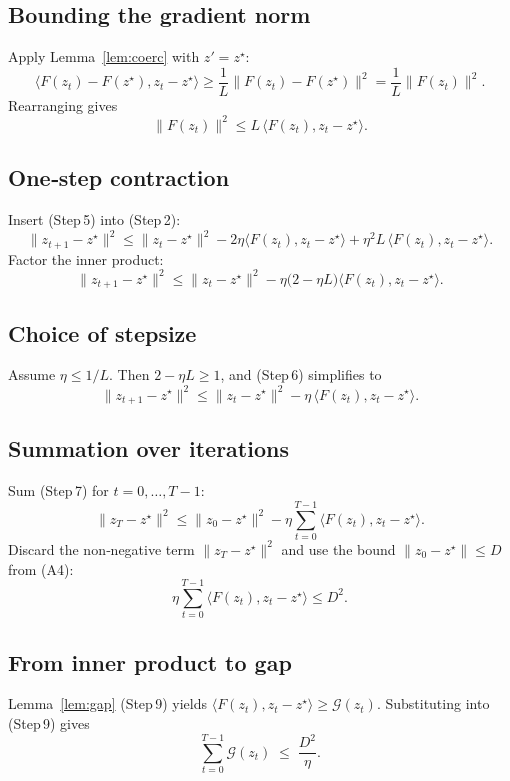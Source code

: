 \documentclass{article}
\begin{document}
\subsection*{Bounding the gradient norm}
Apply Lemma~\ref{lem:coerc} with $z'=z^{\star}$:
\[
\langle F(z_t)-F(z^{\star}),z_t-z^{\star}\rangle
\ge\frac{1}{L}\|F(z_t)-F(z^{\star})\|^{2}
= \frac{1}{L}\|F(z_t)\|^{2}.                                                   \tag{Step 4}
\]
Rearranging gives
\[
\|F(z_t)\|^{2}\le L\,\langle F(z_t),z_t-z^{\star}\rangle .                     \tag{Step 5}
\]

\subsection*{One‑step contraction}
Insert (Step 5) into (Step 2):
\[
\|z_{t+1}-z^{\star}\|^{2}
\le \|z_t-z^{\star}\|^{2}
   -2\eta\langle F(z_t),z_t-z^{\star}\rangle
   +\eta^{2}L\,\langle F(z_t),z_t-z^{\star}\rangle .
\]
Factor the inner product:
\[
\|z_{t+1}-z^{\star}\|^{2}
\le \|z_t-z^{\star}\|^{2}
   -\eta\bigl(2-\eta L\bigr)\langle F(z_t),z_t-z^{\star}\rangle .               \tag{Step 6}
\]

\subsection*{Choice of stepsize}
Assume $\eta\le 1/L$.  Then $2-\eta L\ge1$, and (Step 6) simplifies to
\[
\|z_{t+1}-z^{\star}\|^{2}
\le \|z_t-z^{\star}\|^{2}
   -\eta\,\langle F(z_t),z_t-z^{\star}\rangle .                                 \tag{Step 7}
\]

\subsection*{Summation over iterations}
Sum (Step 7) for $t=0,\dots,T-1$:
\[
\|z_T-z^{\star}\|^{2}
\le \|z_0-z^{\star}\|^{2}
   -\eta\sum_{t=0}^{T-1}\langle F(z_t),z_t-z^{\star}\rangle .                 \tag{Step 8}
\]
Discard the non‑negative term $\|z_T-z^{\star}\|^{2}$ and use the bound
$\|z_0-z^{\star}\|\le D$ from (A4):
\[
\eta\sum_{t=0}^{T-1}\langle F(z_t),z_t-z^{\star}\rangle
\le D^{2}.                                                                     \tag{Step 9}
\]

\subsection*{From inner product to gap}
Lemma~\ref{lem:gap} (Step 9) yields $\langle F(z_t),z_t-z^{\star}\rangle
\ge\mathcal G(z_t)$.  Substituting into (Step 9) gives
\[
\sum_{t=0}^{T-1}\mathcal G(z_t)\;\le\;\frac{D^{2}}{\eta}.                     \tag{Step 10}
\]
\end{document}
